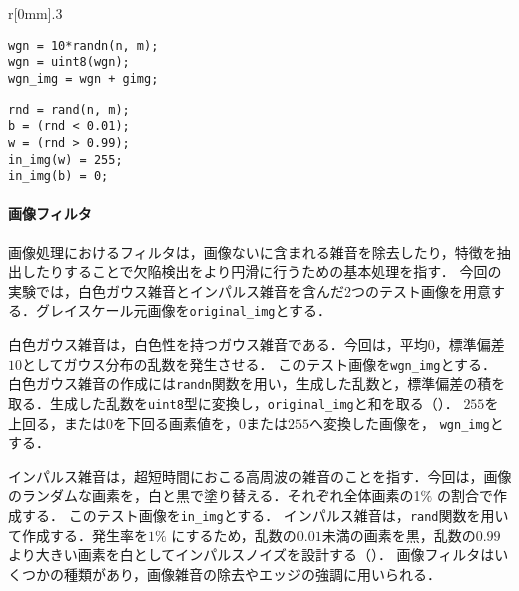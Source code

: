 \begin{wrapfigure}{r}[0mm]{.3\textwidth}
    \vspace{-1cm}
    \begin{lstlisting}[caption={白色ガウス雑音画像の生成},label={src:白色ガウス雑音画像の生成}]
% 画像サイズ : n x m
wgn = 10*randn(n, m);
wgn = uint8(wgn);
wgn_img = wgn + gimg;
    \end{lstlisting}
    \begin{lstlisting}[caption={インパルス雑音画像の生成},label={src:インパルス雑音画像の生成}]
% 画像サイズ : n x m
rnd = rand(n, m);
b = (rnd < 0.01);
w = (rnd > 0.99);
in_img(w) = 255;
in_img(b) = 0;
    \end{lstlisting}
    \vspace{-.5cm}
\end{wrapfigure}
\paragraph{画像フィルタ}
画像処理におけるフィルタは，画像ないに含まれる雑音を除去したり，特徴を抽出したりすることで欠陥検出をより円滑に行うための基本処理を指す\cite{画像フィルタ}．
\newcommand{\originimg}{\texttt{original\_img}}
\newcommand{\wgnimg}{\texttt{wgn\_img}}
\newcommand{\inimg}{\texttt{in\_img}}
今回の実験では，白色ガウス雑音とインパルス雑音を含んだ2つのテスト画像を用意する．グレイスケール元画像を\originimg とする．\par
白色ガウス雑音は，白色性を持つガウス雑音である．今回は，平均\(0\)，標準偏差\(10\)としてガウス分布の乱数を発生させる．
このテスト画像を\wgnimg とする．
白色ガウス雑音の作成には\texttt{randn}関数を用い，生成した乱数と，標準偏差の積を取る．生成した乱数を\texttt{uint8}型に変換し，\originimg と和を取る（）．
\(255\)を上回る，または\(0\)を下回る画素値を，\(0\)または\(255\)へ変換した画像を， \wgnimg とする．\par
インパルス雑音は，超短時間におこる高周波の雑音のことを指す．今回は，画像のランダムな画素を，白と黒で塗り替える．それぞれ全体画素の1\(\%\) の割合で作成する．
このテスト画像を\inimg とする．
インパルス雑音は，\texttt{rand}関数を用いて作成する．発生率を\(1\%\) にするため，乱数の\(0.01\)未満の画素を黒，乱数の\(0.99\)より大きい画素を白としてインパルスノイズを設計する（）．
画像フィルタはいくつかの種類があり，画像雑音の除去やエッジの強調に用いられる．
